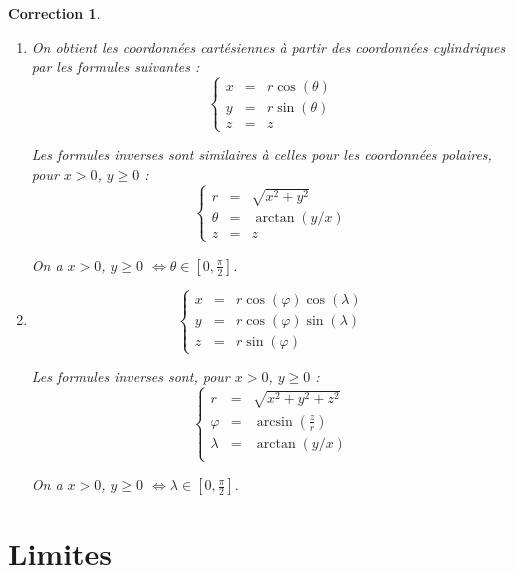 \documentclass[11pt,a4paper]{article}
\renewcommand{\ge}{\geqslant} \renewcommand{\geq}{\geqslant}
\newcommand{\Arcsin}{\mathop{\mathrm{arcsin}}\nolimits}
\newcommand{\Arctan}{\mathop{\mathrm{arctan}}\nolimits}
\theoremstyle{exostyle}
\newtheorem{cor}{Correction}
\newcommand{\correction}{\begin{cor}} \newcommand{\fincorrection}{\end{cor}}
\newcommand{\noindication}{\stepcounter{ind}}
\begin{document}
\noindication
\correction
\begin{enumerate}
	\item 
On obtient les coordonnées cartésiennes à partir des coordonnées cylindriques par les formules suivantes :
$$\left\{\begin{array}{rcl}
	x &=& r\cos(\theta) \\
	y &=& r\sin(\theta) \\	
	z &=& z
\end{array}\right.$$	
	
Les formules inverses sont similaires à celles pour les coordonnées polaires, pour $x>0$, $y\ge0$  :
$$\left\{\begin{array}{rcl}
	r &=& \sqrt{x^2+y^2} \\
	\theta &=&  \Arctan(y/x) \\
	z &=& z
\end{array}\right.$$

On a $x>0$, $y\ge0$ $\iff \theta \in [0,\frac\pi2]$.

	\item 	
$$\left\{\begin{array}{rcl}
	x & = & r \cos(\varphi) \cos(\lambda) \\
	y & = & r \cos(\varphi) \sin(\lambda) \\
	z & = & r \sin(\varphi)
\end{array}\right.$$

Les formules inverses sont, pour $x>0$, $y\ge0$ :
$$\left\{\begin{array}{rcl}
	r &=& \sqrt{x^2+y^2+z^2} \\	
	\varphi &=& \Arcsin\left(\frac z r\right) \\
	\lambda &=& \Arctan(y/x) \\
\end{array}\right.$$

On a $x>0$, $y\ge0$ $\iff \lambda \in [0,\frac\pi2]$.
\end{enumerate}
\fincorrection
\finexercice



\section{Limites}

\end{document}
